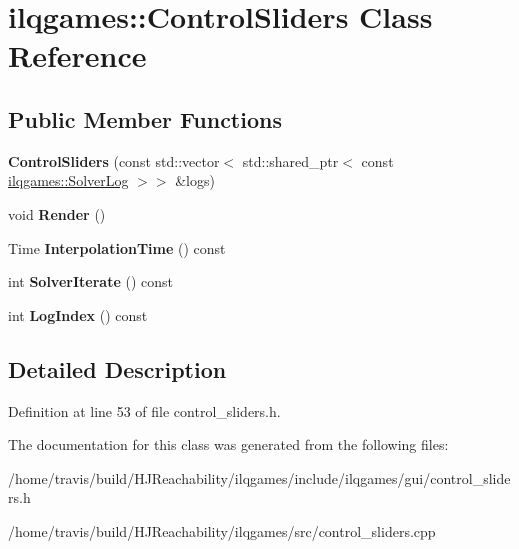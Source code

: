 \hypertarget{classilqgames_1_1_control_sliders}{}\section{ilqgames\+:\+:Control\+Sliders Class Reference}
\label{classilqgames_1_1_control_sliders}
\subsection*{Public Member Functions}
\begin{DoxyCompactItemize}
\item 
{\bfseries Control\+Sliders} (const std\+::vector$<$ std\+::shared\+\_\+ptr$<$ const \hyperlink{classilqgames_1_1_solver_log}{ilqgames\+::\+Solver\+Log} $>$$>$ \&logs)\hypertarget{classilqgames_1_1_control_sliders_a28de3681d7982dcd675f40e51231ed8d}{}\label{classilqgames_1_1_control_sliders_a28de3681d7982dcd675f40e51231ed8d}

\item 
void {\bfseries Render} ()\hypertarget{classilqgames_1_1_control_sliders_a06886eb116592138d8f9340430e4d30d}{}\label{classilqgames_1_1_control_sliders_a06886eb116592138d8f9340430e4d30d}

\item 
Time {\bfseries Interpolation\+Time} () const \hypertarget{classilqgames_1_1_control_sliders_a7bb85832068975ed74580832736bc04d}{}\label{classilqgames_1_1_control_sliders_a7bb85832068975ed74580832736bc04d}

\item 
int {\bfseries Solver\+Iterate} () const \hypertarget{classilqgames_1_1_control_sliders_a6842d4890a86dcd3968f50a12c13045b}{}\label{classilqgames_1_1_control_sliders_a6842d4890a86dcd3968f50a12c13045b}

\item 
int {\bfseries Log\+Index} () const \hypertarget{classilqgames_1_1_control_sliders_a4ac8700f707710484aa7057e78ae5239}{}\label{classilqgames_1_1_control_sliders_a4ac8700f707710484aa7057e78ae5239}

\end{DoxyCompactItemize}


\subsection{Detailed Description}


Definition at line 53 of file control\+\_\+sliders.\+h.



The documentation for this class was generated from the following files\+:\begin{DoxyCompactItemize}
\item 
/home/travis/build/\+H\+J\+Reachability/ilqgames/include/ilqgames/gui/control\+\_\+sliders.\+h\item 
/home/travis/build/\+H\+J\+Reachability/ilqgames/src/control\+\_\+sliders.\+cpp\end{DoxyCompactItemize}
